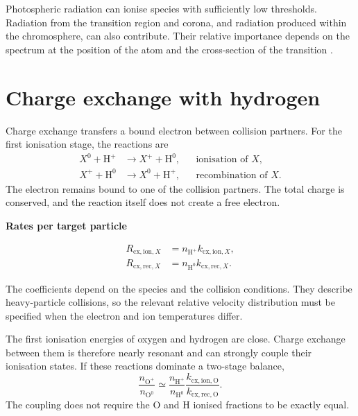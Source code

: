 \documentclass[a4paper,10pt,twoside,openany]{book}
\numberwithin{equation}{chapter}
\newenvironment{example}[1]{%
  \begin{tcolorbox}[bookbox,colback=BoxGray,colframe=RuleGray,
    colbacktitle=MidGray,coltitle=white,
    title={Example: #1}]}{\end{tcolorbox}}
\newcommand{\formula}[2][]{%
  \begin{tcolorbox}[enhanced,breakable,
    colback=LightOrange,colframe=Cap2Orange,arc=6pt,boxrule=1.2pt]
    \if\relax\detokenize{#1}\relax\else
      {\small\bfseries\color{Cap2Orange}#1}\par\smallskip
    \fi
    \begin{equation*}#2\end{equation*}
  \end{tcolorbox}}
\begin{document}
Photospheric radiation can ionise species with sufficiently low
thresholds. Radiation from the transition region and corona, and
radiation produced within the chromosphere, can also contribute.
Their relative importance depends on the spectrum at the position
of the atom and the cross-section of the transition
\cite{Laming2015,Dufresne2021}.

\section{Charge exchange with hydrogen}
Charge exchange transfers a bound electron between collision
partners. For the first ionisation stage, the reactions are
\begin{align}
  X^0+\mathrm{H}^+&\longrightarrow X^++\mathrm{H}^0,
    &&\text{ionisation of }X,\\
  X^++\mathrm{H}^0&\longrightarrow X^0+\mathrm{H}^+,
    &&\text{recombination of }X.
\end{align}
The electron remains bound to one of the collision partners.
The total charge is conserved, and the reaction itself does not
create a free electron.

\formula[Rates per target particle]{
  \begin{aligned}
    R_{\mathrm{cx,ion},X}
      &=n_{\mathrm{H}^+}k_{\mathrm{cx,ion},X},\\
    R_{\mathrm{cx,rec},X}
      &=n_{\mathrm{H}^0}k_{\mathrm{cx,rec},X}.
  \end{aligned}}

The coefficients depend on the species and the collision conditions.
They describe heavy-particle collisions, so the relevant relative
velocity distribution must be specified when the electron and ion
temperatures differ.

\begin{example}{Oxygen and hydrogen}
The first ionisation energies of oxygen and hydrogen are close.
Charge exchange between them is therefore nearly resonant and can
strongly couple their ionisation states. If these reactions dominate
a two-stage balance,
\begin{equation}
  \frac{n_{\mathrm{O}^+}}{n_{\mathrm{O}^0}}
  \simeq
  \frac{n_{\mathrm{H}^+}}{n_{\mathrm{H}^0}}
  \frac{k_{\mathrm{cx,ion},\mathrm O}}
       {k_{\mathrm{cx,rec},\mathrm O}}.
\end{equation}
The coupling does not require the O and H ionised fractions to be
exactly equal.
\end{example}
\end{document}
